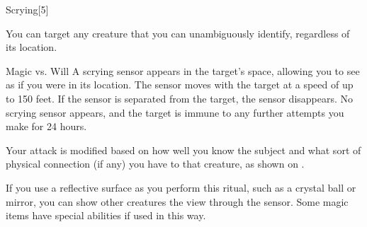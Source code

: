 \begin{spellsection}{Scrying}[5]
    \begin{spellheader}
    \end{spellheader}
    \begin{spellcontent}
        \begin{spelltargetinginfo}
        \end{spelltargetinginfo}
        \begin{spelleffects}

            \spellspecial You can target any creature that you can unambiguously identify, regardless of its location.
            \begin{spellattack}{Magic vs. Will}
                \spellsuccess A scrying sensor appears in the target's space, allowing you to see as if you were in its location. The sensor moves with the target at a speed of up to 150 feet. If the sensor is separated from the target, the sensor disappears.
                \spellfailure No scrying sensor appears, and the target is immune to any further attempts you make for 24 hours.

                \spellspecial Your attack is modified based on how well you know the subject and what sort of physical connection (if any) you have to that creature, as shown on .
            \end{spellattack}
            \spelldur \durmed \dismissable
        \end{spelleffects}
    \end{spellcontent}
    \begin{spellfooter}
        \spellnotes \sensorspellnotes
        \spellnotes If you use a reflective surface as you perform this ritual, such as a crystal ball or mirror, you can show other creatures the view through the sensor. Some magic items have special abilities if used in this way.
    \end{spellfooter}
\end{spellsection}

